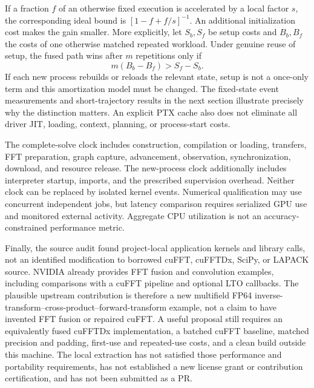 If a fraction \(f\) of an otherwise fixed execution is accelerated by a local factor \(s\), the corresponding ideal bound is \([1-f+f/s]^{-1}\). An additional initialization cost makes the gain smaller. More explicitly, let \(S_b,S_f\) be setup costs and \(B_b,B_f\) the costs of one otherwise matched repeated workload. Under genuine reuse of setup, the fused path wins after \(m\) repetitions only if
\begin{equation}
\label{eq:op-amortization}
m(B_b-B_f)>S_f-S_b.
\end{equation}
If each new process rebuilds or reloads the relevant state, setup is not a once-only term and this amortization model must be changed. The fixed-state event measurements and short-trajectory results in the next section illustrate precisely why the distinction matters. An explicit PTX cache also does not eliminate all driver JIT, loading, context, planning, or process-start costs.

The complete-solve clock includes construction, compilation or loading, transfers, FFT preparation, graph capture, advancement, observation, synchronization, download, and resource release. The new-process clock additionally includes interpreter startup, imports, and the prescribed supervision overhead. Neither clock can be replaced by isolated kernel events. Numerical qualification may use concurrent independent jobs, but latency comparison requires serialized GPU use and monitored external activity. Aggregate CPU utilization is not an accuracy-constrained performance metric.

Finally, the source audit found project-local application kernels and library calls, not an identified modification to borrowed cuFFT, cuFFTDx, SciPy, or LAPACK source. NVIDIA already provides FFT fusion and convolution examples, including comparisons with a cuFFT pipeline and optional LTO callbacks\cite{r17}. The plausible upstream contribution is therefore a new multifield FP64 inverse-transform--cross-product--forward-transform example, not a claim to have invented FFT fusion or repaired cuFFT. A useful proposal still requires an equivalently fused cuFFTDx implementation, a batched cuFFT baseline, matched precision and padding, first-use and repeated-use costs, and a clean build outside this machine. The local extraction has not satisfied those performance and portability requirements, has not established a new license grant or contribution certification, and has not been submitted as a PR\cite{r19}.



